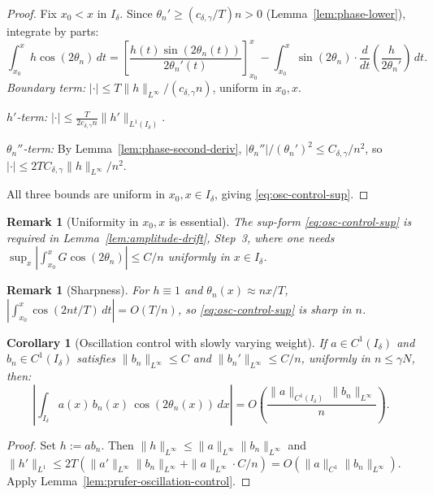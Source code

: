 \documentclass[12pt,a4paper]{amsart}
\newtheorem{corollary}[theorem]{Corollary}
\newtheorem{remark}[theorem]{Remark}
\begin{document}
\begin{proof}
Fix $x_0 < x$ in $I_\delta$.
Since $\theta_n' \ge (c_{\delta,\gamma}/T)n > 0$
(Lemma~\ref{lem:phase-lower}),
integrate by parts:
\begin{equation}\label{eq:ibp2}
  \int_{x_0}^{x} h\cos(2\theta_n)\,dt
  = \left[\frac{h(t)\sin(2\theta_n(t))}{2\theta_n'(t)}\right]_{x_0}^{x}
    - \int_{x_0}^{x} \sin(2\theta_n)\cdot
      \frac{d}{dt}\!\left(\frac{h}{2\theta_n'}\right)\,dt.
\end{equation}
\textit{Boundary term:}
$|\cdot| \le T\|h\|_{L^\infty}/(c_{\delta,\gamma}n)$,
uniform in $x_0, x$.

\textit{$h'$-term:}
$|\cdot| \le \frac{T}{2c_{\delta,\gamma}n}\|h'\|_{L^1(I_\delta)}$.

\textit{$\theta_n''$-term:}
By Lemma~\ref{lem:phase-second-deriv},
$|\theta_n''|/(\theta_n')^2 \le C_{\delta,\gamma}/n^2$, so
$|\cdot| \le 2TC_{\delta,\gamma}\|h\|_{L^\infty}/n^2$.

All three bounds are uniform in $x_0, x \in I_\delta$,
giving \eqref{eq:osc-control-sup}.
\end{proof}

\begin{remark}[Uniformity in $x_0, x$ is essential]
The sup-form \eqref{eq:osc-control-sup} is required in
Lemma~\ref{lem:amplitude-drift}, Step~3,
where one needs
$\sup_{x}|\int_{x_0}^x G\cos(2\theta_n)| \le C/n$
uniformly in $x \in I_\delta$.
\end{remark}

\begin{remark}[Sharpness]
For $h \equiv 1$ and $\theta_n(x) \approx nx/T$,
$|\int_{x_0}^x\cos(2nt/T)\,dt|
= O(T/n)$,
so \eqref{eq:osc-control-sup} is sharp in $n$.
\end{remark}

\begin{corollary}[Oscillation control with slowly varying weight]%
\label{cor:osc-slowly-varying}
If $a \in C^1(I_\delta)$ and $b_n \in C^1(I_\delta)$ satisfies
$\|b_n\|_{L^\infty} \le C$ and
$\|b_n'\|_{L^\infty} \le C/n$,
uniformly in $n \le \gamma N$, then:
\begin{equation}\label{eq:osc-sv}
  \left|\int_{I_\delta}
    a(x)\,b_n(x)\,\cos(2\theta_n(x))\,dx\right|
  = O\!\left(\frac{\|a\|_{C^1(I_\delta)}\,
                   \|b_n\|_{L^\infty}}{n}\right).
\end{equation}
\end{corollary}

\begin{proof}
Set $h := ab_n$.
Then $\|h\|_{L^\infty} \le \|a\|_{L^\infty}\|b_n\|_{L^\infty}$
and $\|h'\|_{L^1} \le 2T(\|a'\|_{L^\infty}\|b_n\|_{L^\infty}
+ \|a\|_{L^\infty}\cdot C/n)
= O(\|a\|_{C^1}\|b_n\|_{L^\infty})$.
Apply Lemma~\ref{lem:prufer-oscillation-control}.
\end{proof}
\end{document}
